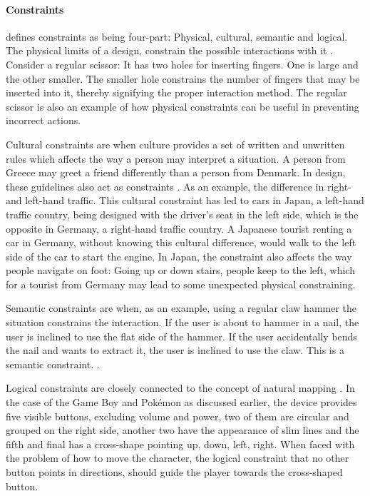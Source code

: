 \paragraph{Constraints}  defines constraints as being four-part: Physical, cultural, semantic and logical. The physical limits of a design, constrain the possible interactions with it \cite{norman}. Consider a regular scissor: It has two holes for inserting fingers. One is large and the other smaller. The smaller hole constrains the number of fingers that may be inserted into it, thereby signifying the proper interaction method. The regular scissor is also an example of how physical constraints can be useful in preventing incorrect actions.

Cultural constraints are when culture provides a set of written and unwritten rules which affects the way a person may interpret a situation. A person from Greece may greet a friend differently than a person from Denmark. In design, these guidelines also act as constraints \cite{norman}. As an example, the difference in right- and left-hand traffic. This cultural constraint has led to cars in Japan, a left-hand traffic country, being designed with the driver's seat in the left side, which is the opposite in Germany, a right-hand traffic country. A Japanese tourist renting a car in Germany, without knowing this cultural difference, would walk to the left side of the car to start the engine. In Japan, the constraint also affects the way people navigate on foot: Going up or down stairs, people keep to the left, which for a tourist from Germany may lead to some unexpected physical constraining.

Semantic constraints are when, as an example, using a regular claw hammer the situation constrains the interaction. If the user is about to hammer in a nail, the user is inclined to use the flat side of the hammer. If the user accidentally bends the nail and wants to extract it, the user is inclined to use the claw. This is a semantic constraint. \cite{norman}.

Logical constraints are closely connected to the concept of natural mapping \cite{norman}. In the case of the Game Boy and Pokémon as discussed earlier, the device provides five visible buttons, excluding volume and power, two of them are circular and grouped on the right side, another two have the appearance of slim lines and the fifth and final has a cross-shape pointing up, down, left, right. When faced with the problem of how to move the character, the logical constraint that no other button points in directions, should guide the player towards the cross-shaped button.

